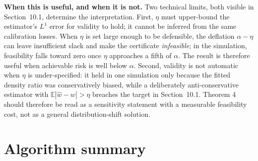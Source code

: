 \documentclass{ieeeaccess}
\begin{document}
\textbf{When this is useful, and when it is not.} Two technical limits, both visible in Section~10.1, determine the interpretation. First, $\eta$ must upper-bound the estimator's $L^1$ error for validity to hold; it cannot be inferred from the same calibration losses. When $\eta$ is set large enough to be defensible, the deflation $\alpha-\eta$ can leave insufficient slack and make the certificate \emph{infeasible}; in the simulation, feasibility falls toward zero once $\eta$ approaches a fifth of $\alpha$. The result is therefore useful when achievable risk is well below $\alpha$. Second, validity is not automatic when $\eta$ is under-specified: it held in one simulation only because the fitted density ratio was conservatively biased, while a deliberately anti-conservative estimator with $\mathbb E|\hat w-w|>\eta$ breaches the target in Section~10.1. Theorem 4 should therefore be read as a sensitivity statement with a measurable feasibility cost, not as a general distribution-shift solution.

\section{Algorithm summary}
\end{document}
